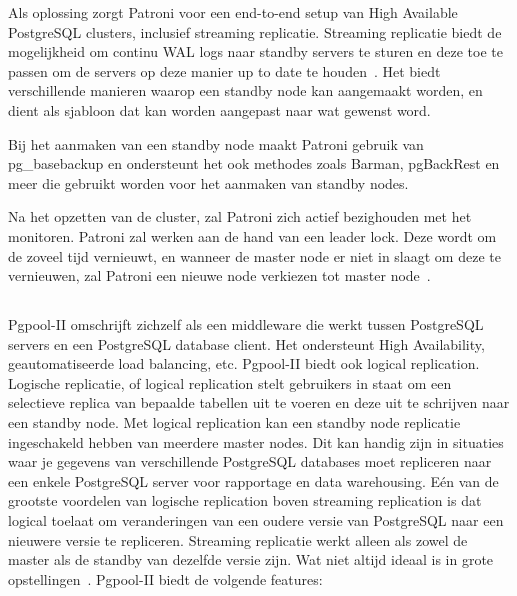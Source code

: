 Als oplossing zorgt Patroni voor een end-to-end setup van High Available PostgreSQL clusters, inclusief streaming replicatie. Streaming replicatie biedt de mogelijkheid om continu WAL logs naar standby servers te sturen en deze toe te passen om de servers op deze manier up to date te houden~\autocite{2020}. %
Het biedt verschillende manieren waarop een standby node kan aangemaakt worden, en dient als sjabloon dat kan worden aangepast naar wat gewenst word.

Bij het aanmaken van een standby node maakt Patroni gebruik van pg\_basebackup en ondersteunt het ook methodes zoals Barman, pgBackRest en meer die gebruikt worden voor het aanmaken van standby nodes.

Na het opzetten van de cluster, zal Patroni zich actief bezighouden met het monitoren. Patroni zal werken aan de hand van een leader lock. Deze wordt om de zoveel tijd vernieuwt, en wanneer de master node er niet in slaagt om deze te vernieuwen, zal Patroni een nieuwe node verkiezen tot master node~\autocite{ScaleGrid2018}. %


\subsection{}
\label{subsec:Pgpool-II}


Pgpool-II omschrijft zichzelf als een middleware die werkt tussen PostgreSQL servers en een PostgreSQL database client. Het ondersteunt High Availability, geautomatiseerde load balancing, etc. Pgpool-II biedt ook logical replication. Logische replicatie, of logical replication stelt gebruikers in staat om een selectieve replica van bepaalde tabellen uit te voeren en deze uit te schrijven naar een standby node. Met logical replication kan een standby node replicatie ingeschakeld hebben van meerdere master nodes. Dit kan handig zijn in situaties waar je gegevens van verschillende PostgreSQL databases moet repliceren naar een enkele PostgreSQL server voor rapportage en data warehousing. Eén van de grootste voordelen van logische replication boven streaming replication is dat logical toelaat om veranderingen van een oudere versie van PostgreSQL naar een nieuwere versie te repliceren. Streaming replicatie werkt alleen als zowel de master als de standby van dezelfde versie zijn. Wat niet altijd ideaal is in grote opstellingen~\autocite{Vallarapu2019}. %
Pgpool-II biedt de volgende features:

